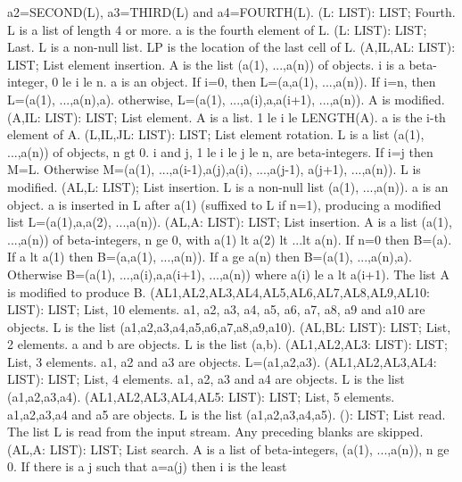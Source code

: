 a2=SECOND(L), a3=THIRD(L) and a4=FOURTH(L). \ecom 
{} (L: LIST): LIST; \eproc
\bcom Fourth. L is a list of length 4 or more. a is the fourth element
of L. \ecom 
{} (L: LIST): LIST; \eproc
\bcom Last. L is a non-null list. LP is the location of the last cell
of L. \ecom 
{} (A,IL,AL: LIST): LIST; \eproc
\bcom List element insertion. A is the list (a(1), ...,a(n)) of objects.
i is a beta-integer, 0 le i le n.  a is an object.  If i=0, then
L=(a,a(1), ...,a(n)).  If i=n, then L=(a(1), ...,a(n),a).
otherwise, L=(a(1), ...,a(i),a,a(i+1), ...,a(n)). A is modified. \ecom 
{} (A,IL: LIST): LIST; \eproc
\bcom List element. A is a list. 1 le i le LENGTH(A). a is the i-th
element of A. \ecom 
{} (L,IL,JL: LIST): LIST; \eproc
\bcom List element rotation. L is a list (a(1), ...,a(n)) of objects, n
gt 0.  i and j, 1 le i le j le n, are beta-integers.  If i=j
then M=L.  Otherwise M=(a(1), ...,a(i-1),a(j),a(i), ...,a(j-1),
a(j+1), ...,a(n)). L is modified. \ecom 
{} (AL,L: LIST); \eproc
\bcom List insertion. L is a non-null list (a(1), ...,a(n)). a is an
object.  a is inserted in L after a(1) (suffixed to L if n=1),
producing a modified list L=(a(1),a,a(2), ...,a(n)). \ecom 
{} (AL,A: LIST): LIST; \eproc
\bcom List insertion. A is a list (a(1), ...,a(n)) of beta-integers,
n ge 0, with a(1) lt a(2) lt  ...lt a(n).  If n=0 then B=(a).
If a lt a(1) then B=(a,a(1), ...,a(n)).  If a ge a(n) then
B=(a(1), ...,a(n),a).  Otherwise B=(a(1), ...,a(i),a,a(i+1),
 ...,a(n)) where a(i) le a lt a(i+1).  The list A is modified
to produce B. \ecom 
{} (AL1,AL2,AL3,AL4,AL5,AL6,AL7,AL8,AL9,AL10: LIST): LIST; \eproc
\bcom List, 10 elements. a1, a2, a3, a4, a5, a6, a7, a8, a9 and a10 are
objects. L is the list (a1,a2,a3,a4,a5,a6,a7,a8,a9,a10). \ecom 
{} (AL,BL: LIST): LIST; \eproc
\bcom List, 2 elements. a and b are objects. L is the list (a,b). \ecom 
{} (AL1,AL2,AL3: LIST): LIST; \eproc
\bcom List, 3 elements. a1, a2 and a3 are objects. L=(a1,a2,a3). \ecom 
{} (AL1,AL2,AL3,AL4: LIST): LIST; \eproc
\bcom List, 4 elements. a1, a2, a3 and a4 are objects. L is the list
(a1,a2,a3,a4). \ecom 
{} (AL1,AL2,AL3,AL4,AL5: LIST): LIST; \eproc
\bcom List, 5 elements. a1,a2,a3,a4 and a5 are objects. L is the list
(a1,a2,a3,a4,a5). \ecom 
{} (): LIST; \eproc
\bcom List read. The list L is read from the input stream. Any preceding
blanks are skipped. \ecom 
{} (AL,A: LIST): LIST; \eproc
\bcom List search. A is a list of beta-integers, (a(1), ...,a(n)),
n ge 0.  If there is a j such that a=a(j) then i is the least
